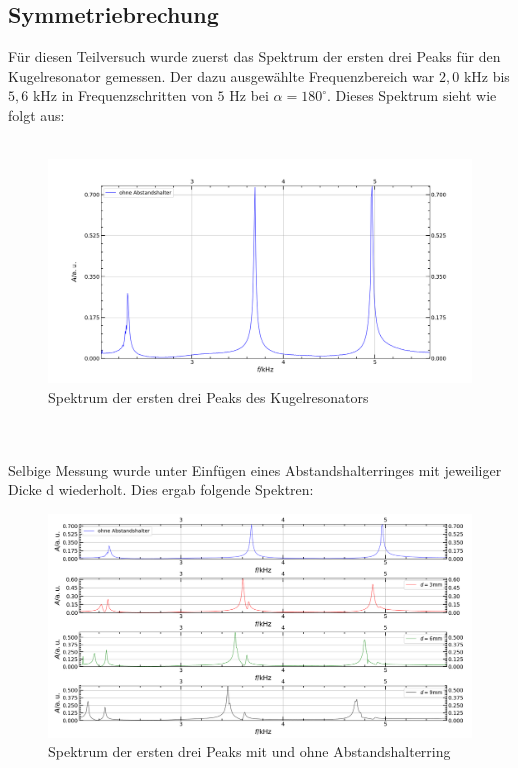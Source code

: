 \documentclass[german,  %
parskip=full,  %
]{scrartcl}
\begin{document}
\subsection{Symmetriebrechung}
Für diesen Teilversuch wurde zuerst das Spektrum der ersten drei Peaks für den Kugelresonator gemessen. Der dazu ausgewählte Frequenzbereich war $2,0$ kHz bis $5,6$ kHz in Frequenzschritten von $5$ Hz bei $\alpha = 180^{\circ}$. Dieses Spektrum sieht wie folgt aus:
\\\\
\begin{figure}[h!]
\centering
\includegraphics[width=\textwidth]{441_Uebersicht.png}
\caption{Spektrum der ersten drei Peaks des Kugelresonators }
\end{figure}
\\\\
Selbige Messung wurde unter Einfügen eines Abstandshalterringes mit jeweiliger Dicke d wiederholt. Dies ergab folgende Spektren:
\newpage
\begin{figure}[h!]
\centering
\includegraphics[width=\textwidth]{442_und_443.png}
\caption{Spektrum der ersten drei Peaks mit und ohne Abstandshalterring}
\end{figure}
\end{document}
